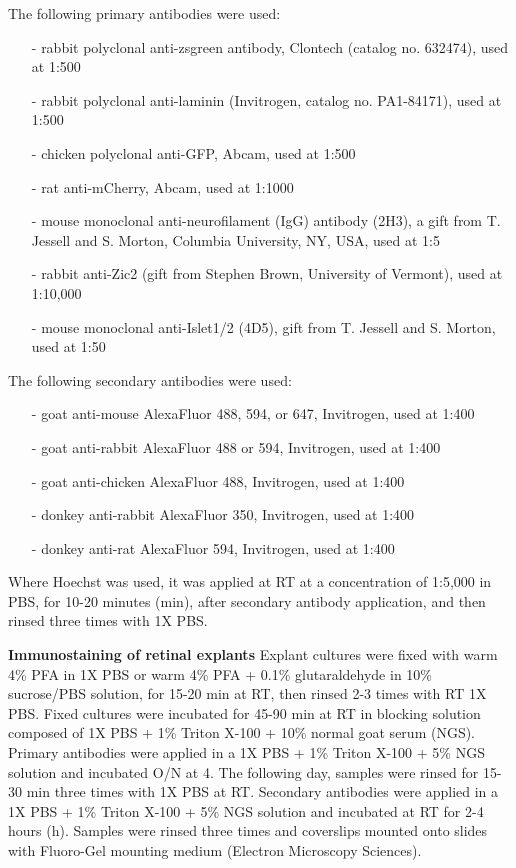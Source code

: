 The following primary antibodies were used:
\begin{itemize}
	\item[-] rabbit polyclonal anti-zsgreen antibody, Clontech (catalog no. 632474), used at 1:500
	\item[-] rabbit polyclonal anti-laminin (Invitrogen, catalog no. PA1-84171), used at 1:500
	\item[-] chicken polyclonal anti-GFP, Abcam, used at 1:500
	\item[-] rat anti-mCherry, Abcam, used at 1:1000 %
	\item[-] mouse monoclonal anti-neurofilament (IgG) antibody (2H3), a gift from T. Jessell and S. Morton, Columbia University, NY, USA, used at 1:5
	\item[-] rabbit anti-Zic2 (gift from Stephen Brown, University of Vermont), used at 1:10,000
	\item[-] mouse monoclonal anti-Islet1/2 (4D5), gift from T. Jessell and S. Morton, used at 1:50
\end{itemize}

The following secondary antibodies were used:
\begin{itemize}
	\item[-] goat anti-mouse AlexaFluor 488, 594, or 647, Invitrogen, used at 1:400
	\item[-] goat anti-rabbit AlexaFluor 488 or 594, Invitrogen, used at 1:400
	\item[-] goat anti-chicken AlexaFluor 488, Invitrogen, used at 1:400
	\item[-] donkey anti-rabbit AlexaFluor 350, Invitrogen, used at 1:400
	\item[-] donkey anti-rat AlexaFluor 594, Invitrogen, used at 1:400
\end{itemize}
Where Hoechst was used, it was applied at RT at a concentration of 1:5,000 in PBS, for 10-20 minutes (min), after secondary antibody application, and then rinsed three times with 1X PBS.

\noindent\textbf{Immunostaining of retinal explants} \newline
\indent Explant cultures were fixed with warm 4\% PFA in 1X PBS or warm 4\% PFA + 0.1\% glutaraldehyde in 10\% sucrose/PBS solution, for 15-20 min at RT, then rinsed 2-3 times with RT 1X PBS.
Fixed cultures were incubated for 45-90 min at RT in blocking solution composed of 1X PBS + 1\% Triton X-100 + 10\% normal goat serum (NGS).
Primary antibodies were applied in a 1X PBS + 1\% Triton X-100 + 5\% NGS solution and incubated O/N at 4\textcelsius.
The following day, samples were rinsed for 15-30 min three times with 1X PBS at RT.
Secondary antibodies were applied in a 1X PBS + 1\% Triton X-100 + 5\% NGS solution and incubated at RT for 2-4 hours (h).
Samples were rinsed three times and coverslips mounted onto slides with Fluoro-Gel mounting medium (Electron Microscopy Sciences).

